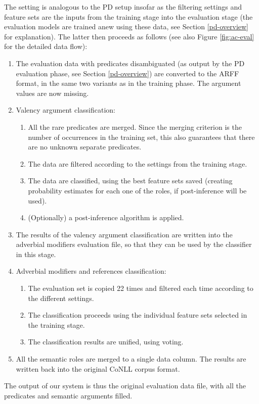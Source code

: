 \documentclass[12pt,notitlepage,a4paper]{report}
\begin{document}
The setting is analogous to the PD setup insofar as the filtering settings and feature sets are the inputs from the training stage into the evaluation stage (the evaluation models are trained anew using these data, see Section \ref{pd-overview} for explanation). The latter then proceeds as follows (see also Figure \ref{fig:ac-eval} for the detailed data flow):
\begin{enumerate}
    \item The evaluation data with predicates disambiguated (as output by the PD evaluation phase, see Section \ref{pd-overview}) are converted to the ARFF format, in the same two variants as in the training phase. The argument values are now missing.
    \item Valency argument classification:
    \begin{enumerate}
        \item All the rare predicates are merged. Since the merging criterion is the number of occurrences in the training set, this also guarantees that there are no unknown separate predicates.
        \item The data are filtered according to the settings from the training stage.
        \item The data are classified, using the best feature sets saved (creating probability estimates for each one of the roles, if post-inference will be used).
        \item (Optionally) a post-inference algorithm is applied.
    \end{enumerate}
    \item The results of the valency argument classification are written into the adverbial modifiers evaluation file, so that they can be used by the classifier in this stage.
    \item Adverbial modifiers and references classification:
    \begin{enumerate}
        \item The evaluation set is copied 22 times and filtered each time according to the different settings.
        \item The classification proceeds using the individual feature sets selected in the training stage.
        \item The classification results are unified, using voting.
    \end{enumerate}
    \item All the semantic roles are merged to a single data column. The results are written back into the original CoNLL corpus format.
\end{enumerate}
The output of our system is thus the original evaluation data file, with all the predicates and semantic arguments filled.
\end{document}
